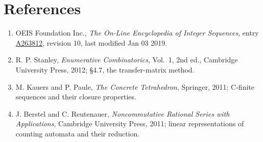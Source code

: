 \documentclass[11pt]{article}
\theoremstyle{definition}
\begin{document}
\section{References}

\begin{enumerate}

\item OEIS Foundation Inc., \emph{The On-Line Encyclopedia of Integer Sequences}, entry \href{https://oeis.org/A263812}{A263812}, revision 10, last modified Jan 03 2019.

\item R. P. Stanley, \emph{Enumerative Combinatorics}, Vol.~1, 2nd ed., Cambridge University Press, 2012; \S4.7, the transfer-matrix method.

\item M. Kauers and P. Paule, \emph{The Concrete Tetrahedron}, Springer, 2011; C-finite sequences and their closure properties.

\item J. Berstel and C. Reutenauer, \emph{Noncommutative Rational Series with Applications}, Cambridge University Press, 2011; linear representations of counting automata and their reduction.

\end{enumerate}
\end{document}
